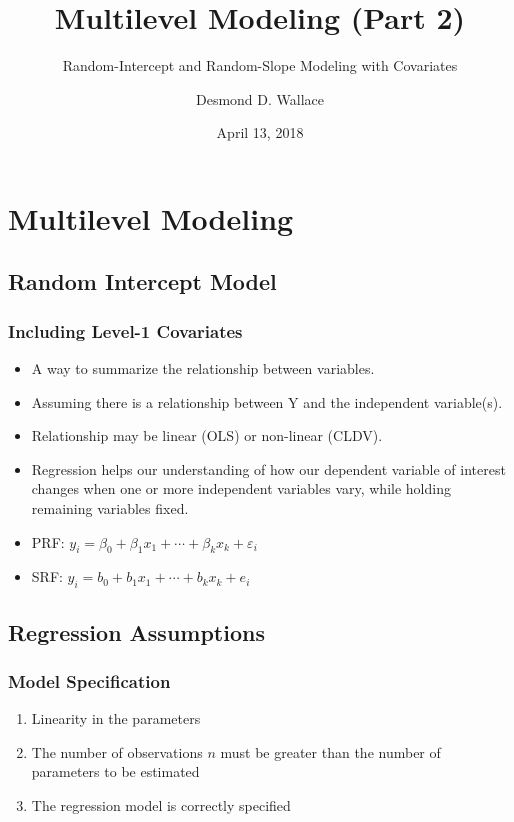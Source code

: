 \documentclass{beamer}
\title[MLM I]{Multilevel Modeling (Part 2)}
\subtitle[ISRC Workshop]{Random-Intercept and Random-Slope Modeling with Covariates}
\author[Wallace]{Desmond D. Wallace}
\institute[University of Iowa]{Department of Political Science\\The University of Iowa\\Iowa City, IA}
\date{April 13, 2018}
\begin{document}
\begin{frame}
	\titlepage
\end{frame}


\section{Multilevel Modeling}

\subsection{Random Intercept Model}

\begin{frame}
	\frametitle{Including Level-1 Covariates}
	\begin{itemize}
		\item A way to summarize the relationship between variables.
		\item Assuming there is a relationship between Y and the independent variable(s).
		\item Relationship may be linear (OLS) or non-linear (CLDV).
		\item Regression helps our understanding of how our dependent variable of interest changes when one or more independent variables vary, while holding remaining variables fixed.
		\item PRF: $y_{i}=\beta_{0}+\beta_{1}x_{1}+\cdots+\beta_{k}x_{k}+\varepsilon_{i}$
		\item SRF: $y_{i}=b_{0}+b_{1}x_{1}+\cdots+b_{k}x_{k}+e_{i}$
	\end{itemize}
\end{frame}

\subsection{Regression Assumptions}

\begin{frame}
	\frametitle{Model Specification}
		\begin{enumerate}
			\item Linearity in the parameters
			\item The number of observations $n$ must be greater than the number of parameters to be estimated
			\item The regression model is correctly specified
		\end{enumerate}
\end{frame}
\end{document}
